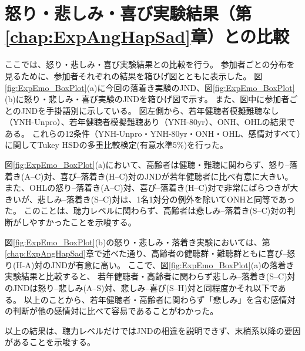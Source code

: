 





\clearpage
\section{怒り・悲しみ・喜び実験結果（第\ref{chap:ExpAngHapSad}章）との比較}
ここでは、怒り・悲しみ・喜び実験結果との比較を行う。
参加者ごとの分布を見るために、参加者それぞれの結果を箱ひげ図とともに表示した。
図\ref{fig:ExpEmo_BoxPlot}(a)に今回の落着き実験のJND、図\ref{fig:ExpEmo_BoxPlot}(b)に怒り・悲しみ・喜び実験のJNDを箱ひげ図で示す。
また、図中に参加者ごとのJNDを手掛語別に示している。
図左側から、若年健聴者模擬難聴なし（YNH-Unpro）、若年健聴者模擬難聴あり（YNH-80yr）、ONH、OHLの結果である。
これらの12条件（YNH-Unpro・YNH-80yr・ONH・OHL、感情対すべて）に関してTukey HSDの多重比較検定(有意水準5\%)を行った。

図\ref{fig:ExpEmo_BoxPlot}(a)において、高齢者は健聴・難聴に関わらず、怒り--落着き(A--C)対、喜び--落着き(H--C)対のJNDが若年健聴者に比べ有意に大きい。
また、OHLの怒り--落着き(A--C)対、喜び--落着き(H--C)対で非常にばらつきが大きいが、悲しみ--落着き(S--C)対は、1名1対分の例外を除いてONHと同等であった。
このことは、聴力レベルに関わらず、高齢者は悲しみ--落着き(S--C)対の判断がしやすかったことを示唆する。

図\ref{fig:ExpEmo_BoxPlot}(b)の怒り・悲しみ・落着き実験においては、第\ref{chap:ExpAngHapSad}章で述べた通り、高齢者の健聴群・難聴群ともに喜び--怒り(H-A)対のJNDが有意に高い。
ここで、図\ref{fig:ExpEmo_BoxPlot}(a)の落着き実験結果と比較すると、
若年健聴者・高齢者に関わらず悲しみ--落着き(S--C)対のJNDは怒り--悲しみ(A--S)対、悲しみ--喜び(S--H)対と同程度かそれ以下である。
以上のことから、若年健聴者・高齢者に関わらず「悲しみ」を含む感情対の判断が他の感情対に比べて容易であることがわかった。

以上の結果は、聴力レベルだけではJNDの相違を説明できず、末梢系以降の要因があることを示唆する。




